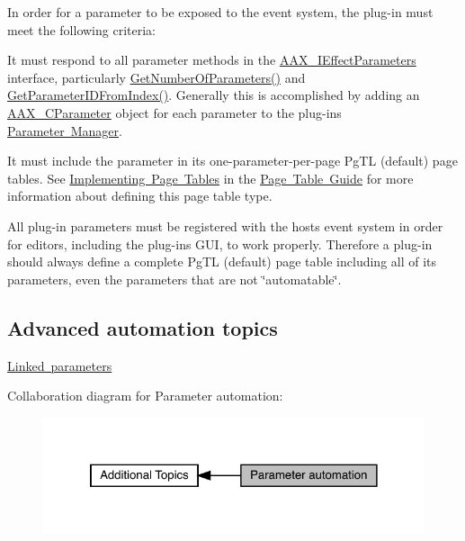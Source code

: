In order for a parameter to be exposed to the event system, the plug-\/in must meet the following criteria\+: \begin{DoxyItemize}
\item It must respond to all parameter methods in the \mbox{\hyperlink{a01825}{A\+A\+X\+\_\+\+I\+Effect\+Parameters}} interface, particularly \mbox{\hyperlink{a01669_a8af398b1e308849464aee5a6713a3965}{Get\+Number\+Of\+Parameters()}} and \mbox{\hyperlink{a01669_a5387b83e0f684a5bf0e09b24cae257d9}{Get\+Parameter\+I\+D\+From\+Index()}}. Generally this is accomplished by adding an \mbox{\hyperlink{a01537}{A\+A\+X\+\_\+\+C\+Parameter}} object for each parameter to the plug-\/in\textquotesingle{}s \mbox{\hyperlink{a00814}{Parameter Manager}}. \item It must include the parameter in its one-\/parameter-\/per-\/page {\ttfamily \textquotesingle{}Pg\+TL\textquotesingle{}} (default) page tables. See \mbox{\hyperlink{a00833_aax_page_table_guide_05_implementing_page_tables}{Implementing Page Tables}} in the \mbox{\hyperlink{a00833}{Page Table Guide}} for more information about defining this page table type.\end{DoxyItemize}
All plug-\/in parameters must be registered with the host\textquotesingle{}s event system in order for editors, including the plug-\/in\textquotesingle{}s G\+UI, to work properly. Therefore a plug-\/in should always define a complete {\ttfamily \textquotesingle{}Pg\+TL\textquotesingle{}} (default) page table including all of its parameters, even the parameters that are not \char`\"{}automatable\char`\"{}.



 \hypertarget{a00819_parameterAutomation_advanced}{}\subsection{Advanced automation topics}\label{a00819_parameterAutomation_advanced}
 \begin{DoxyItemize}
\item \mbox{\hyperlink{a00824}{Linked parameters}}\end{DoxyItemize}
 Collaboration diagram for Parameter automation\+:
\nopagebreak
\begin{figure}[H]
\begin{center}
\leavevmode
\includegraphics[width=322pt]{a00819}
\end{center}
\end{figure}
